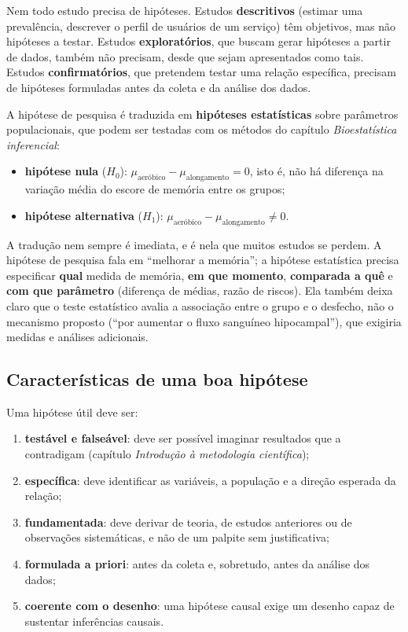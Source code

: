 \documentclass[
]{book}
\providecommand{\tightlist}{%
  \setlength{\itemsep}{0pt}\setlength{\parskip}{0pt}}
\begin{document}
Nem todo estudo precisa de hipóteses. Estudos \textbf{descritivos} (estimar uma prevalência, descrever o perfil de usuários de um serviço) têm objetivos, mas não hipóteses a testar. Estudos \textbf{exploratórios}, que buscam gerar hipóteses a partir de dados, também não precisam, desde que sejam apresentados como tais. Estudos \textbf{confirmatórios}, que pretendem testar uma relação específica, precisam de hipóteses formuladas antes da coleta e da análise dos dados.

A hipótese de pesquisa é traduzida em \textbf{hipóteses estatísticas} sobre parâmetros populacionais, que podem ser testadas com os métodos do capítulo \emph{Bioestatística inferencial}:

\begin{itemize}
\tightlist
\item
  \textbf{hipótese nula} (\(H_0\)): \(\mu_{\text{aeróbico}} - \mu_{\text{alongamento}} = 0\), isto é, não há diferença na variação média do escore de memória entre os grupos;
\item
  \textbf{hipótese alternativa} (\(H_1\)): \(\mu_{\text{aeróbico}} - \mu_{\text{alongamento}} \neq 0\).
\end{itemize}

A tradução nem sempre é imediata, e é nela que muitos estudos se perdem. A hipótese de pesquisa fala em ``melhorar a memória''; a hipótese estatística precisa especificar \textbf{qual} medida de memória, \textbf{em que momento}, \textbf{comparada a quê} e \textbf{com que parâmetro} (diferença de médias, razão de riscos). Ela também deixa claro que o teste estatístico avalia a associação entre o grupo e o desfecho, não o mecanismo proposto (``por aumentar o fluxo sanguíneo hipocampal''), que exigiria medidas e análises adicionais.

\subsection{Características de uma boa hipótese}\label{caracteruxedsticas-de-uma-boa-hipuxf3tese}

Uma hipótese útil deve ser:

\begin{enumerate}
\def\labelenumi{\arabic{enumi}.}
\tightlist
\item
  \textbf{testável e falseável}: deve ser possível imaginar resultados que a contradigam (capítulo \emph{Introdução à metodologia científica});
\item
  \textbf{específica}: deve identificar as variáveis, a população e a direção esperada da relação;
\item
  \textbf{fundamentada}: deve derivar de teoria, de estudos anteriores ou de observações sistemáticas, e não de um palpite sem justificativa;
\item
  \textbf{formulada a priori}: antes da coleta e, sobretudo, antes da análise dos dados;
\item
  \textbf{coerente com o desenho}: uma hipótese causal exige um desenho capaz de sustentar inferências causais.
\end{enumerate}
\end{document}
